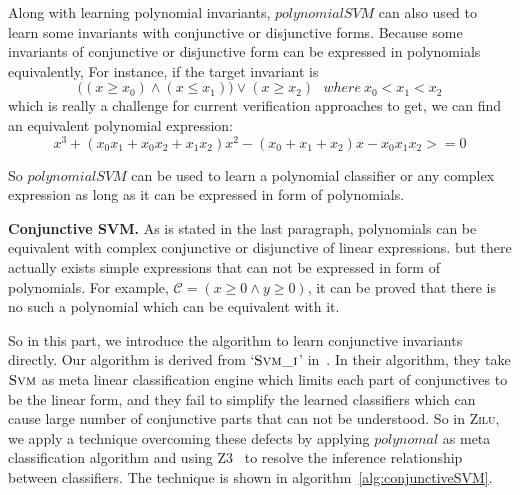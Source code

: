 Along with learning polynomial invariants,
$polynomialSVM$ can also used to learn some invariants with conjunctive or disjunctive forms.
Because some invariants of conjunctive or disjunctive form can be expressed in polynomials equivalently,
For instance, if the target invariant is 
$$\big((x \ge x_0) \wedge (x \le x_1)\big) \vee (x \ge x_2) ~~~where\ x_0 < x_1 < x_2$$
which is really a challenge for current verification approaches to get,
we can find an equivalent polynomial expression:
$$x^3 + (x_0x_1 + x_0x_2 + x_1x_2)x^2 - (x_0 + x_1 + x_2)x - x_0x_1x_2 >= 0$$

So $polynomialSVM$ can be used to learn a polynomial classifier or any complex expression as long as it can be expressed in form of polynomials.

\medskip\noindent
\textbf{Conjunctive SVM.}
As is stated in the last paragraph, polynomials can be equivalent with complex conjunctive or disjunctive of linear expressions.
but there actually exists simple expressions that can not be expressed in form of polynomials.
For example, $\mathcal{C} = (x \ge 0 \wedge y \ge 0)$,
it can be proved that there is no such a polynomial which can be equivalent with it.

So in this part, we introduce the algorithm to learn conjunctive invariants directly.
Our algorithm is derived from `$\textsc{Svm\_i}$' in~\cite{sharma2012interpolants}.
In their algorithm, they take $\textsc{Svm}$ as meta linear classification engine which limits each part of conjunctives to be the linear form, 
and they fail to simplify the learned classifiers which can cause large number of conjunctive parts that can not be understood.
So in \textsc{Zilu}, we apply a technique overcoming these defects by applying $polynomal$ as meta classification algorithm 
and using Z3~\cite{de2008z3} to resolve the inference relationship between classifiers.
The technique is shown in algorithm~\ref{alg:conjunctiveSVM}.%


